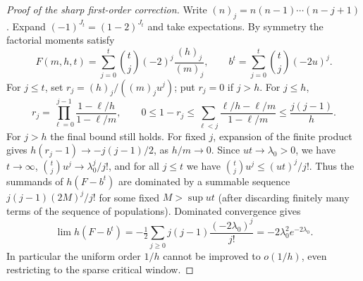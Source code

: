 \documentclass[11pt]{article}
\theoremstyle{remark}\newtheorem{remark}[theorem]{Remark}
\begin{document}
\begin{proof}[Proof of the sharp first-order correction]
Write $(n)_j=n(n-1)\cdots(n-j+1)$. Expand $(-1)^{J_t}=(1-2)^{J_t}$ and take expectations. By symmetry the factorial moments satisfy
\[
 F(m,h,t)=\sum_{j=0}^{t}\binom tj(-2)^j\frac{(h)_j}{(m)_j},\qquad
 b^t=\sum_{j=0}^{t}\binom tj(-2u)^j.
\]
For $j\le t$, set $r_j=(h)_j/((m)_j u^j)$; put $r_j=0$ if $j>h$. For $j\le h$,
\[
 r_j=\prod_{\ell=0}^{j-1}\frac{1-\ell/h}{1-\ell/m},\qquad
 0\le1-r_j\le\sum_{\ell<j}\frac{\ell/h-\ell/m}{1-\ell/m}\le\frac{j(j-1)}h.
\]
For $j>h$ the final bound still holds. For fixed $j$, expansion of the finite product gives
$h(r_j-1)\to-j(j-1)/2$, as $h/m\to0$. Since $ut\to\lambda_0>0$, we have $t\to\infty$, $\binom tj u^j\to\lambda_0^j/j!$, and for all $j\le t$ we have $\binom tj u^j\le(ut)^j/j!$. Thus the summands of $h(F-b^t)$ are dominated by a summable sequence $j(j-1)(2M)^j/j!$ for some fixed $M>\sup ut$ (after discarding finitely many terms of the sequence of populations). Dominated convergence gives
\[
 \lim h(F-b^t)=-\tfrac12\sum_{j\ge0}j(j-1)\frac{(-2\lambda_0)^j}{j!}
 =-2\lambda_0^2e^{-2\lambda_0}.
\]
In particular the uniform order $1/h$ cannot be improved to $o(1/h)$, even restricting to the sparse critical window.
\end{proof}
\end{document}
